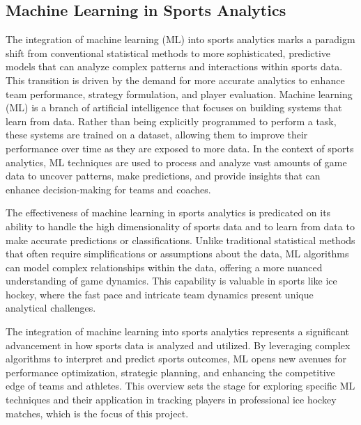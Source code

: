 \documentclass[12pt, letterpaper]{article}
\begin{document}
{
\setlength{\parskip}{0.3cm}
\subsection{Machine Learning in Sports Analytics}
\begin{spacing}{1.2}
The integration of machine learning (ML) into sports analytics marks a paradigm shift from conventional statistical methods to more sophisticated, predictive models that can analyze complex patterns and interactions within sports data. This transition is driven by the demand for more accurate analytics to enhance team performance, strategy formulation, and player evaluation. Machine learning (ML) is a branch of artificial intelligence that focuses on building systems that learn from data. Rather than being explicitly programmed to perform a task, these systems are trained on a dataset, allowing them to improve their performance over time as they are exposed to more data. In the context of sports analytics, ML techniques are used to process and analyze vast amounts of game data to uncover patterns, make predictions, and provide insights that can enhance decision-making for teams and coaches.

The effectiveness of machine learning in sports analytics is predicated on its ability to handle the high dimensionality of sports data and to learn from data to make accurate predictions or classifications. Unlike traditional statistical methods that often require simplifications or assumptions about the data, ML algorithms can model complex relationships within the data, offering a more nuanced understanding of game dynamics. This capability is valuable in sports like ice hockey, where the fast pace and intricate team dynamics present unique analytical challenges.

The integration of machine learning into sports analytics represents a significant advancement in how sports data is analyzed and utilized. By leveraging complex algorithms to interpret and predict sports outcomes, ML opens new avenues for performance optimization, strategic planning, and enhancing the competitive edge of teams and athletes. This overview sets the stage for exploring specific ML techniques and their application in tracking players in professional ice hockey matches, which is the focus of this project.



\end{spacing}}
\end{document}
